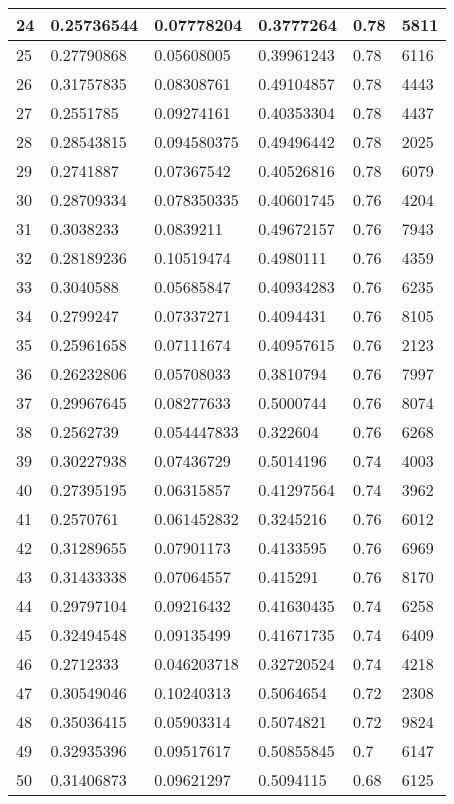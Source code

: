 \begin{longtable}{|l|l|l|l|l|l|}
24 & 0.25736544 & 0.07778204 & 0.3777264 & 0.78 & 5811 \\ \hline 
25 & 0.27790868 & 0.05608005 & 0.39961243 & 0.78 & 6116 \\ \hline 
26 & 0.31757835 & 0.08308761 & 0.49104857 & 0.78 & 4443 \\ \hline 
27 & 0.2551785 & 0.09274161 & 0.40353304 & 0.78 & 4437 \\ \hline 
28 & 0.28543815 & 0.094580375 & 0.49496442 & 0.78 & 2025 \\ \hline 
29 & 0.2741887 & 0.07367542 & 0.40526816 & 0.78 & 6079 \\ \hline 
30 & 0.28709334 & 0.078350335 & 0.40601745 & 0.76 & 4204 \\ \hline 
31 & 0.3038233 & 0.0839211 & 0.49672157 & 0.76 & 7943 \\ \hline 
32 & 0.28189236 & 0.10519474 & 0.4980111 & 0.76 & 4359 \\ \hline 
33 & 0.3040588 & 0.05685847 & 0.40934283 & 0.76 & 6235 \\ \hline 
34 & 0.2799247 & 0.07337271 & 0.4094431 & 0.76 & 8105 \\ \hline 
35 & 0.25961658 & 0.07111674 & 0.40957615 & 0.76 & 2123 \\ \hline 
36 & 0.26232806 & 0.05708033 & 0.3810794 & 0.76 & 7997 \\ \hline 
37 & 0.29967645 & 0.08277633 & 0.5000744 & 0.76 & 8074 \\ \hline 
38 & 0.2562739 & 0.054447833 & 0.322604 & 0.76 & 6268 \\ \hline 
39 & 0.30227938 & 0.07436729 & 0.5014196 & 0.74 & 4003 \\ \hline 
40 & 0.27395195 & 0.06315857 & 0.41297564 & 0.74 & 3962 \\ \hline 
41 & 0.2570761 & 0.061452832 & 0.3245216 & 0.76 & 6012 \\ \hline 
42 & 0.31289655 & 0.07901173 & 0.4133595 & 0.76 & 6969 \\ \hline 
43 & 0.31433338 & 0.07064557 & 0.415291 & 0.76 & 8170 \\ \hline 
44 & 0.29797104 & 0.09216432 & 0.41630435 & 0.74 & 6258 \\ \hline 
45 & 0.32494548 & 0.09135499 & 0.41671735 & 0.74 & 6409 \\ \hline 
46 & 0.2712333 & 0.046203718 & 0.32720524 & 0.74 & 4218 \\ \hline 
47 & 0.30549046 & 0.10240313 & 0.5064654 & 0.72 & 2308 \\ \hline 
48 & 0.35036415 & 0.05903314 & 0.5074821 & 0.72 & 9824 \\ \hline 
49 & 0.32935396 & 0.09517617 & 0.50855845 & 0.7 & 6147 \\ \hline 
50 & 0.31406873 & 0.09621297 & 0.5094115 & 0.68 & 6125 \\ \hline 
\end{longtable}